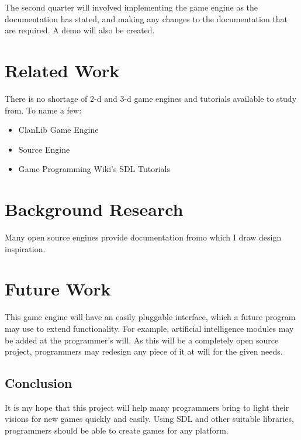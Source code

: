 \documentclass[12pt]{article}
\begin{document}
    The second quarter will involved implementing the game engine as the documentation has stated, and making any changes to the documentation that are required. A demo will also be created.

  \section{Related Work}
    There is no shortage of 2-d and 3-d game engines and tutorials available to study from. To name a few:
    \begin{itemize}
      \item ClanLib Game Engine
      \item Source Engine
      \item Game Programming Wiki's SDL Tutorials
    \end{itemize}

  \section{Background Research}
    Many open source engines provide documentation fromo which I draw design inspiration.

  \section{Future Work}
    This game engine will have an easily pluggable interface, which a future program may use to extend functionality. For example, artificial intelligence modules may be added at the programmer's will. As this will be a completely open source project, programmers may redesign any piece of it at will for the given needs.

  \subsection{Conclusion}
    It is my hope that this project will help many programmers bring to light their visions for new games quickly and easily. Using SDL and other suitable libraries, programmers should be able to create games for any platform.
\end{document}
